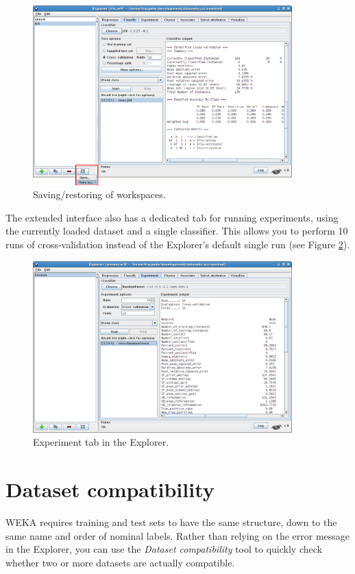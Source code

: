 \begin{figure}[htb]
  \centering
  \includegraphics[width=10.0cm]{images/explorerext-workspaces.png}
  \caption{Saving/restoring of workspaces.}
  \label{explorerext-workspaces}
\end{figure}

The extended interface also has a dedicated tab for running experiments, using
the currently loaded dataset and a single classifier. This allows you to 
perform 10 runs of cross-validation instead of the Explorer's default single
run (see Figure \ref{explorerext-experiment}).

\begin{figure}[htb]
  \centering
  \includegraphics[width=10.0cm]{images/explorerext-experiment.png}
  \caption{Experiment tab in the Explorer.}
  \label{explorerext-experiment}
\end{figure}

\clearpage
\section{Dataset compatibility}

WEKA requires training and test sets to have the same structure, down to the
same name and order of nominal labels. Rather than relying on the error message
in the Explorer, you can use the \textit{Dataset compatibility} tool to 
quickly check whether two or more datasets are actually compatible.

